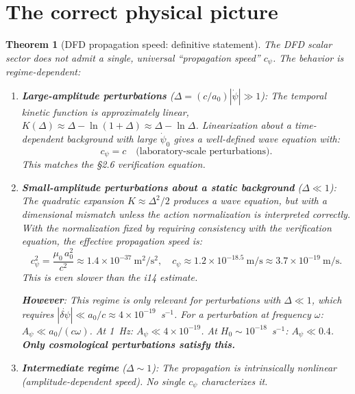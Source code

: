 \documentclass[11pt]{article}
\newtheorem{theorem}{Theorem}
\newcommand{\ee}[1]{\times 10^{#1}}
\begin{document}
\section{The correct physical picture}
\label{sec:physical}

\begin{theorem}[DFD propagation speed: definitive statement]
\label{thm:definitive}
The DFD scalar sector does not admit a single, universal ``propagation
speed'' $c_\psi$. The behavior is regime-dependent:

\begin{enumerate}
\item \textbf{Large-amplitude perturbations} ($\Delta = (c/a_0)|\dot\psi| \gg 1$):
  The temporal kinetic function is approximately linear,
  $K(\Delta) \approx \Delta - \ln(1+\Delta) \approx \Delta - \ln\Delta$.
  Linearization about a \emph{time-dependent} background with large $\dot\psi_0$
  gives a well-defined wave equation with:
  \begin{equation}
  c_\psi = c \quad \text{(laboratory-scale perturbations)}.
  \end{equation}
  This matches the \S2.6 verification equation.

\item \textbf{Small-amplitude perturbations about a static background}
  ($\Delta \ll 1$): The quadratic expansion $K \approx \Delta^2/2$
  produces a wave equation, but with a dimensional mismatch unless
  the action normalization is interpreted correctly.
  With the normalization fixed by requiring consistency with the
  verification equation, the effective propagation speed is:
  \begin{equation}
  c_\psi^2 = \frac{\mu_0\,a_0^2}{c^2} \approx 1.4\ee{-37}~\text{m}^2/\text{s}^2,
  \quad c_\psi \approx 1.2\ee{-18.5}~\text{m/s} \approx 3.7\ee{-19}~\text{m/s}.
  \label{eq:cpsi-small-Delta}
  \end{equation}
  This is even slower than the i14 estimate.

  \textbf{However}: This regime is only relevant for perturbations with
  $\Delta \ll 1$, which requires $|\dot{\delta\psi}| \ll a_0/c \approx
  4\ee{-19}$~s$^{-1}$. For a perturbation at frequency $\omega$:
  $A_\psi \ll a_0/(c\omega)$. At 1~Hz: $A_\psi \ll 4\ee{-19}$. At
  $H_0 \sim 10^{-18}$~s$^{-1}$: $A_\psi \ll 0.4$.
  \textbf{Only cosmological perturbations satisfy this.}

\item \textbf{Intermediate regime} ($\Delta \sim 1$): The propagation
  is intrinsically nonlinear (amplitude-dependent speed). No single
  $c_\psi$ characterizes it.
\end{enumerate}
\end{theorem}
\end{document}
